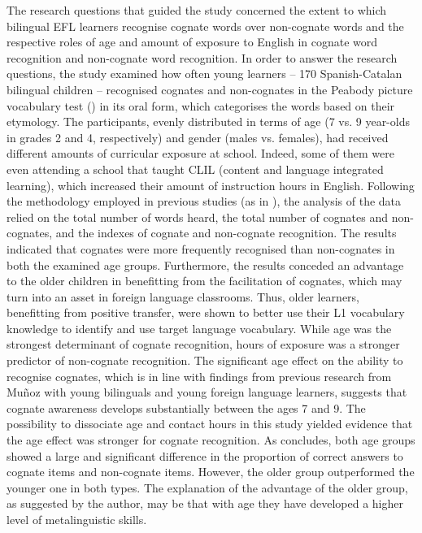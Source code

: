 \documentclass[output=paper,colorlinks,citecolor=brown,nonflat]{langsci/langscibook}
\begin{document}
The research questions that guided the study concerned the extent to which bilingual EFL learners recognise cognate words over non-cognate words and the respective roles of age and amount of exposure to English in cognate word recognition and non-cognate word recognition. In order to answer the research questions, the study examined how often young learners – 170 Spanish-Catalan bilingual children – recognised cognates and non-cognates in the Peabody picture vocabulary test (\citealt{DunnDunn2007}) in its oral form, which categorises the words based on their etymology. The participants, evenly distributed in terms of age (7 vs. 9 year-olds in grades 2 and 4, respectively) and gender (males vs. females), had received different amounts of curricular exposure at school. Indeed, some of them were even attending a school that taught CLIL (content and language integrated learning), which increased their amount of instruction hours in English. Following the methodology employed in previous studies (as in \citealt{MuñozCadiernoCasas2018}), the analysis of the data relied on the total number of words heard, the total number of cognates and non-cognates, and the indexes of cognate and non-cognate recognition. The results indicated that cognates were more frequently recognised than non-cognates in both the examined age groups. Furthermore, the results conceded an advantage to the older children in benefitting from the facilitation of cognates, which may turn into an asset in foreign language classrooms. Thus, older learners, benefitting from positive transfer, were shown to better use their L1 vocabulary knowledge to identify and use target language vocabulary. While age was the strongest determinant of cognate recognition, hours of exposure was a stronger predictor of non-cognate recognition. The significant age effect on the ability to recognise cognates, which is in line with findings from previous research from Muñoz with young bilinguals and young foreign language learners, suggests that cognate awareness develops substantially between the ages 7 and 9. The possibility to dissociate age and contact hours in this study yielded evidence that the age effect was stronger for cognate recognition. As \citeauthor{chapters/munoz} concludes, both age groups showed a large and significant difference in the proportion of correct answers to cognate items and non-cognate items. However, the older group outperformed the younger one in both types. The explanation of the advantage of the older group, as suggested by the author, may be that with age they have developed a higher level of metalinguistic skills.
\end{document}
